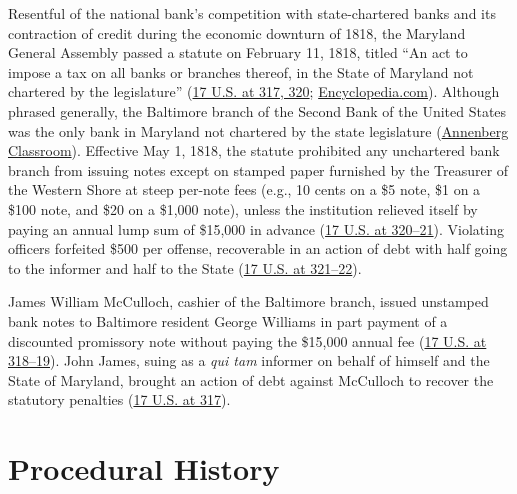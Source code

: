 \documentclass[12pt]{article}
\begin{document}
Resentful of the national bank's competition with state-chartered banks and its contraction of credit during the economic downturn of 1818, the Maryland General Assembly passed a statute on February 11, 1818, titled ``An act to impose a tax on all banks or branches thereof, in the State of Maryland not chartered by the legislature'' (\href{https://supreme.justia.com/cases/federal/us/17/316/}{17 U.S. at 317, 320}; \href{https://www.encyclopedia.com/law/legal-and-political-magazines/mcculloch-v-maryland-1819}{Encyclopedia.com}). Although phrased generally, the Baltimore branch of the Second Bank of the United States was the only bank in Maryland not chartered by the state legislature (\href{https://www.annenbergclassroom.org/resource/the-pursuit-of-justice/pursuit-justice-chapter-2-national-bank-federalism/}{Annenberg Classroom}). Effective May 1, 1818, the statute prohibited any unchartered bank branch from issuing notes except on stamped paper furnished by the Treasurer of the Western Shore at steep per-note fees (e.g., 10 cents on a \$5 note, \$1 on a \$100 note, and \$20 on a \$1,000 note), unless the institution relieved itself by paying an annual lump sum of \$15,000 in advance (\href{https://supreme.justia.com/cases/federal/us/17/316/}{17 U.S. at 320--21}). Violating officers forfeited \$500 per offense, recoverable in an action of debt with half going to the informer and half to the State (\href{https://supreme.justia.com/cases/federal/us/17/316/}{17 U.S. at 321--22}).

James William McCulloch, cashier of the Baltimore branch, issued unstamped bank notes to Baltimore resident George Williams in part payment of a discounted promissory note without paying the \$15,000 annual fee (\href{https://supreme.justia.com/cases/federal/us/17/316/}{17 U.S. at 318--19}). John James, suing as a \textit{qui tam} informer on behalf of himself and the State of Maryland, brought an action of debt against McCulloch to recover the statutory penalties (\href{https://supreme.justia.com/cases/federal/us/17/316/}{17 U.S. at 317}).

\section{Procedural History}
\end{document}
